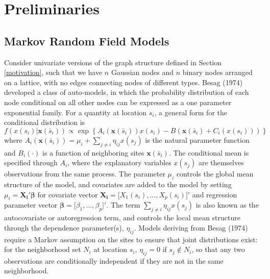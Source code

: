 \documentclass[12pt, a4paper, twoside]{article}
\begin{document}
\section{Preliminaries}\label{prelims}
\subsection{Markov Random Field Models}\label{MRFs}
Consider univariate versions of the graph structure defined in Section \ref{motivation}, such that we have $n$ Gaussian nodes and $n$ binary nodes arranged on a lattice, with no edges connecting nodes of different types. Besag (1974) developed a class of auto-models, in which the probability distribution of each node conditional on all other nodes can be expressed as a one parameter exponential family. For a quantity at location $s_i$, a general form for the conditional distribution is
\begin{equation} \label{Besag}
f(x(s_i) | \boldsymbol{x}(\bar{s}_i) ) \propto \exp\left\lbrace A_i(\boldsymbol{x}(\bar{s}_i) )x(s_i)-B(\boldsymbol{x}(\bar{s}_i) + C_i(x(s_i))) \right\rbrace
\end{equation}
where $A_i(\boldsymbol{x}(\bar{s}_i) ) = \mu_i + \sum_{j\neq i}^{}\eta_{ij}x(s_j)$ is the natural parameter function and $B_i(\cdot)$ is a function of neighboring sites $\boldsymbol{x}(\bar{s}_i) $. The conditional mean is specified through $A_i$, where the explanatory variables $x(s_j)$ are themselves observations from the same process. The parameter $\mu_i$ controls the global mean structure of the model, and covariates are added to the model by setting $\mu_i = \boldsymbol{X_i}'\boldsymbol{\beta}$ for covariate vector $\boldsymbol{X_i} = \lbrack X_1(s_i),...,X_p(s_i)\rbrack'$ and regression parameter vector $\boldsymbol{\beta} = \lbrack\beta_1,...,\beta_p\rbrack'$. The term $\sum_{j\neq i}^{}\eta_{ij}x(s_j)$ is also known as the autocovariate or autoregression term, and controls the local mean structure through the dependence parameter(s), $\eta_{ij}$. Models deriving from Besag (1974) require a Markov assumption on the sites to ensure that joint distributions exist: for the neighborhood set $N_i$ at location $s_i$, $\eta_{ij} = 0$ if $s_j \notin N_i$, so that any two observations are conditionally independent if they are not in the same neighborhood.
\end{document}

